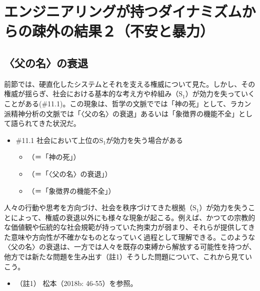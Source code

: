 \section{エンジニアリングが持つダイナミズムからの疎外の結果２（不安と暴力）}\label{ux30a8ux30f3ux30b8ux30cbux30a2ux30eaux30f3ux30b0ux304cux6301ux3064ux30c0ux30a4ux30caux30dfux30baux30e0ux304bux3089ux306eux758eux5916ux306eux7d50ux679cuxff12ux4e0dux5b89ux3068ux66b4ux529b}

\subsection{〈父の名〉の衰退}\label{ux7236ux306eux540dux306eux8870ux9000}

前節では、硬直化したシステムとそれを支える権威について見た。しかし、その権威が揺らぎ、社会における基本的な考え方や枠組み（\(\textrm{S}_1\)）が効力を失っていくことがある(\#11.1)。この現象は、哲学の文脈ででは「神の死」として、ラカン派精神分析の文脈では「〈父の名〉の衰退」あるいは「象徴界の機能不全」として語られてきた状況だ。

\begin{note}{}
  \begin{itemize}
    \tightlist
    \item{\#11.1}
      社会において上位の$\textrm{S}_1$が効力を失う場合がある
      \begin{itemize}
          \tightlist
          \item
          （＝「神の死」）
          \item
          （＝「〈父の名〉の衰退」）
          \item
          （＝「象徴界の機能不全」）
        \end{itemize}
  \end{itemize}
\end{note}

人々の行動や思考を方向づけ、社会を秩序づけてきた根拠（\(\textrm{S}_1\)）が効力を失うことによって、権威の衰退以外にも様々な現象が起こる。例えば、かつての宗教的な価値観や伝統的な社会規範が持っていた拘束力が弱まり、それらが提供してきた意味や方向性が不確かなものとなっていく過程として理解できる。このような〈父の名〉の衰退は、一方では人々を既存の束縛から解放する可能性を持つが、他方では新たな問題を生み出す（註1）そうした問題について、これから見ていこう。

\begin{itemize}
\tightlist
\item
  （註1） 松本（2018b: 46-55）\cite{Matsumoto2}を参照。
\end{itemize}

